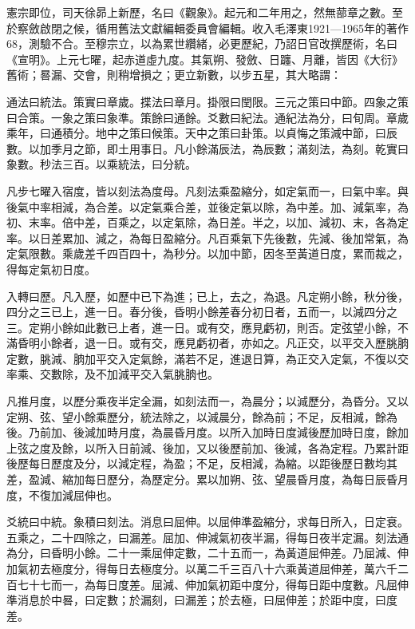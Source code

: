 
\begin{pinyinscope}

 憲宗即位，司天徐昴上新歷，名曰《觀象》。起元和二年用之，然無蔀章之數。至於察斂啟閉之候，循用舊法文獻編輯委員會編輯。收入毛澤東1921—1965年的著作68，測驗不合。至穆宗立，以為累世纘緒，必更歷紀，乃詔日官改撰歷術，名曰《宣明》。上元七曜，起赤道虛九度。其氣朔、發斂、日躔、月離，皆因《大衍》舊術；晷漏、交會，則稍增損之；更立新數，以步五星，其大略謂：



 通法曰統法。策實曰章歲。揲法曰章月。掛限曰閏限。三元之策曰中節。四象之策曰合策。一象之策曰象準。策餘曰通餘。爻數曰紀法。通紀法為分，曰旬周。章歲乘年，曰通積分。地中之策曰候策。天中之策曰卦策。以貞悔之策減中節，曰辰數。以加季月之節，即土用事日。凡小餘滿辰法，為辰數；滿刻法，為刻。乾實曰象數。秒法三百。以乘統法，曰分統。



 凡步七曜入宿度，皆以刻法為度母。凡刻法乘盈縮分，如定氣而一，曰氣中率。與後氣中率相減，為合差。以定氣乘合差，並後定氣以除，為中差。加、減氣率，為初、末率。倍中差，百乘之，以定氣除，為日差。半之，以加、減初、末，各為定率。以日差累加、減之，為每日盈縮分。凡百乘氣下先後數，先減、後加常氣，為定氣限數。乘歲差千四百四十，為秒分。以加中節，因冬至黃道日度，累而裁之，得每定氣初日度。



 入轉曰歷。凡入歷，如歷中已下為進；已上，去之，為退。凡定朔小餘，秋分後，四分之三已上，進一日。春分後，昏明小餘差春分初日者，五而一，以減四分之三。定朔小餘如此數已上者，進一日。或有交，應見虧初，則否。定弦望小餘，不滿昏明小餘者，退一日。或有交，應見虧初者，亦如之。凡正交，以平交入歷朓朒定數，朓減、朒加平交入定氣餘，滿若不足，進退日算，為正交入定氣，不復以交率乘、交數除，及不加減平交入氣朓朒也。



 凡推月度，以歷分乘夜半定全漏，如刻法而一，為晨分；以減歷分，為昏分。又以定朔、弦、望小餘乘歷分，統法除之，以減晨分，餘為前；不足，反相減，餘為後。乃前加、後減加時月度，為晨昏月度。以所入加時日度減後歷加時日度，餘加上弦之度及餘，以所入日前減、後加，又以後歷前加、後減，各為定程。乃累計距後歷每日歷度及分，以減定程，為盈；不足，反相減，為縮。以距後歷日數均其差，盈減、縮加每日歷分，為歷定分。累以加朔、弦、望晨昏月度，為每日辰昏月度，不復加減屈伸也。



 爻統曰中統。象積曰刻法。消息曰屈伸。以屈伸準盈縮分，求每日所入，日定衰。五乘之，二十四除之，曰漏差。屈加、伸減氣初夜半漏，得每日夜半定漏。刻法通為分，曰昏明小餘。二十一乘屈伸定數，二十五而一，為黃道屈伸差。乃屈減、伸加氣初去極度分，得每日去極度分。以萬二千三百八十六乘黃道屈伸差，萬六千二百七十七而一，為每日度差。屈減、伸加氣初距中度分，得每日距中度數。凡屈伸準消息於中晷，曰定數；於漏刻，曰漏差；於去極，曰屈伸差；於距中度，曰度差。




\end{pinyinscope}

